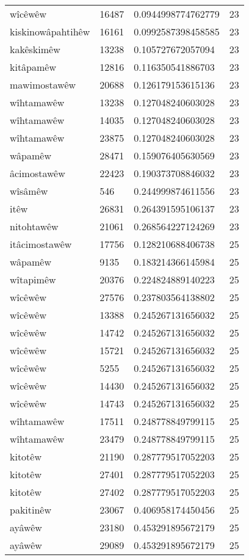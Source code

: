 \begin{longtable}{llll}
wîcêwêw & 16487 & 0.0944998774762779 & 23\\
kiskinowâpahtihêw & 16161 & 0.0992587398458585 & 23\\
kakêskimêw & 13238 & 0.105727672057094 & 23\\
kitâpamêw & 12816 & 0.116350541886703 & 23\\
mawimostawêw & 20688 & 0.126179153615136 & 23\\
wîhtamawêw & 13238 & 0.127048240603028 & 23\\
wîhtamawêw & 14035 & 0.127048240603028 & 23\\
wîhtamawêw & 23875 & 0.127048240603028 & 23\\
wâpamêw & 28471 & 0.159076405630569 & 23\\
âcimostawêw & 22423 & 0.190373708846032 & 23\\
wîsâmêw & 546 & 0.244999874611556 & 23\\
itêw & 26831 & 0.264391595106137 & 23\\
nitohtawêw & 21061 & 0.268564227124269 & 23\\
itâcimostawêw & 17756 & 0.128210688406738 & 25\\
wâpamêw & 9135 & 0.183214366145984 & 25\\
wîtapimêw & 20376 & 0.224824889140223 & 25\\
wîcêwêw & 27576 & 0.237803564138802 & 25\\
wîcêwêw & 13388 & 0.245267131656032 & 25\\
wîcêwêw & 14742 & 0.245267131656032 & 25\\
wîcêwêw & 15721 & 0.245267131656032 & 25\\
wîcêwêw & 5255 & 0.245267131656032 & 25\\
wîcêwêw & 14430 & 0.245267131656032 & 25\\
wîcêwêw & 14743 & 0.245267131656032 & 25\\
wîhtamawêw & 17511 & 0.248778849799115 & 25\\
wîhtamawêw & 23479 & 0.248778849799115 & 25\\
kitotêw & 21190 & 0.287779517052203 & 25\\
kitotêw & 27401 & 0.287779517052203 & 25\\
kitotêw & 27402 & 0.287779517052203 & 25\\
pakitinêw & 23067 & 0.406958174450456 & 25\\
ayâwêw & 23180 & 0.453291895672179 & 25\\
ayâwêw & 29089 & 0.453291895672179 & 25\\

\end{longtable}
